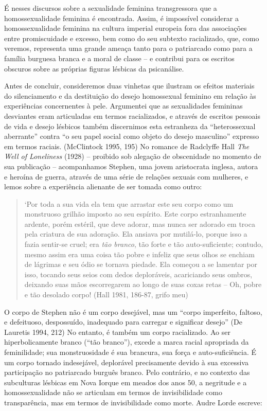 É nesses discursos sobre a sexualidade feminina transgressora que a
homossexualidade feminina é encontrada. Assim, é impossível considerar a
homossexualidade feminina na cultura imperial europeia fora das
associações entre promiscuidade e excesso, bem como do seu subtexto
racializado, que, como veremos, representa uma grande ameaça tanto para
o patriarcado como para a família burguesa branca e a moral de classe --
e contribui para os escritos obscuros sobre as próprias figuras lésbicas
da psicanálise.

Antes de concluir, consideremos duas vinhetas que ilustram os efeitos
materiais do silenciamento e da destituição do desejo homossexual
feminino em relação às experiências concernentes à pele. Argumentei que
as sexualidades femininas desviantes eram articuladas em termos
racializados, e através de escritos pessoais de vida e desejo lésbicos
também discernimos esta estranheza da ``heterossexual aberrante'' contra
``o seu papel social como objeto do desejo masculino'' expresso em termos
raciais. (McClintock 1995, 195) No romance de Radclyffe Hall \emph{The
Well of Loneliness} (1928) -- proibido sob alegação de obscenidade no
momento de sua publicação -- acompanhamos Stephen, uma jovem aristocrata
inglesa, autora e heroína de guerra, através de uma série de relações
sexuais com mulheres, e lemos sobre a experiência alienante de ser
tomada como outro:

\begin{quote}
`Por toda a sua vida ela tem que arrastar este seu corpo como um
monstruoso grilhão imposto ao seu espírito. Este corpo estranhamente
ardente, porém estéril, que deve adorar, mas nunca ser adorado em troca
pela criatura de sua adoração. Ela ansiava por mutilá-lo, porque isso a
fazia sentir-se cruel; era \emph{tão branco}, tão forte e tão
auto-suficiente; contudo, mesmo assim era uma coisa tão pobre e infeliz
que seus olhos se enchiam de lágrimas e seu ódio se tornava piedade. Ela
começou a se lamentar por isso, tocando seus seios com dedos
deploráveis, acariciando seus ombros, deixando suas mãos escorregarem ao
longo de suas coxas retas -- Oh, pobre e tão desolado corpo! (Hall 1981,
186-87, grifo meu)
\end{quote}

O corpo de Stephen não é um corpo desejável, mas um ``corpo imperfeito,
faltoso, e defeituoso, despossuído, inadequado para carregar e
significar desejo'' (De Lauretis 1994, 212) No entanto, é também um
corpo racializado. Ao ser hiperbolicamente branco (``tão branco''), excede
a marca racial apropriada da feminilidade; sua monstruosidade é sua
brancura, sua força e auto-suficiência. É um corpo tornado indesejável,
deplorável precisamente devido à sua excessiva participação no
patriarcado burguês branco. Pelo contrário, e no contexto das
subculturas lésbicas em Nova Iorque em meados dos anos 50, a negritude e
a homossexualidade não se articulam em termos de invisibilidade como
transparência, mas em termos de invisibilidade como morte. Audre Lorde
escreve:

